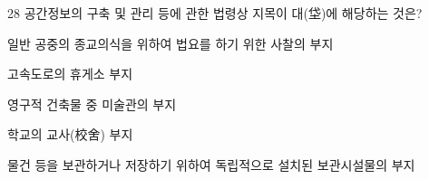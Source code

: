 \begin{question}{28}
공간정보의 구축 및 관리 등에 관한 법령상 지목이 대(垈)에 해당하는 것은?
\begin{choices}
  \item 일반 공중의 종교의식을 위하여 법요를 하기 위한 사찰의 부지
  \item 고속도로의 휴게소 부지
  \item 영구적 건축물 중 미술관의 부지
  \item 학교의 교사(校舍) 부지
  \item 물건 등을 보관하거나 저장하기 위하여 독립적으로 설치된 보관시설물의 부지
\end{choices}
\end{question}
